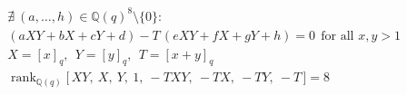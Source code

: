 \documentclass{article}
\begin{document}
\[
\begin{aligned}
&\nexists\ (a,\dots,h)\in\mathbb{Q}(q)^{8}\setminus\{0\}:\\
&(aXY+bX+cY+d)-T\,(eXY+fX+gY+h)=0\ \ \text{for all }x,y>1\\
&X=[x]_q,\ \ Y=[y]_q,\ \ T=[x+y]_q\\
&\operatorname{rank}_{\mathbb{Q}(q)}\bigl[\,XY,\ X,\ Y,\ 1,\ -TXY,\ -TX,\ -TY,\ -T\,\bigr]=8
\end{aligned}
\]
\end{document}
